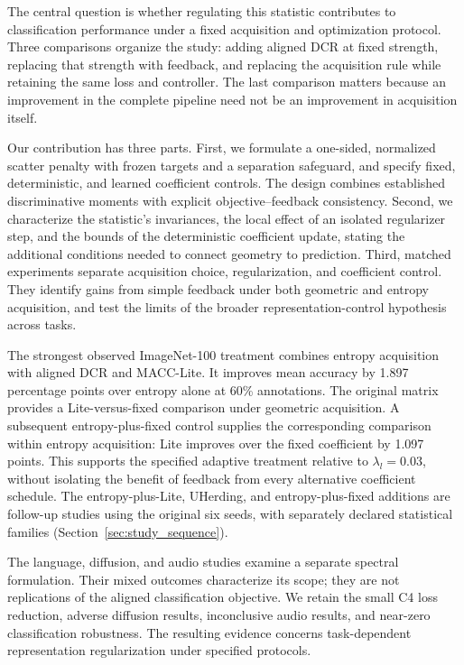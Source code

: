 \documentclass[a4paper,fleqn]{cas-dc}
\begin{document}
The central question is whether regulating this statistic contributes
to classification performance under a fixed acquisition and optimization
protocol. Three comparisons organize the study: adding aligned DCR at
fixed strength, replacing that strength with feedback, and replacing the
acquisition rule while retaining the same loss and controller. The last
comparison matters because an improvement in the complete pipeline need
not be an improvement in acquisition itself.

Our contribution has three parts. First, we formulate a one-sided,
normalized scatter penalty with frozen targets and a separation safeguard,
and specify fixed, deterministic, and learned coefficient controls.
The design combines established discriminative moments with explicit
objective--feedback consistency. Second, we characterize the statistic's
invariances, the local effect of an isolated regularizer step, and the
bounds of the deterministic coefficient update, stating the additional
conditions needed to connect geometry to prediction. Third, matched
experiments separate acquisition choice, regularization, and coefficient
control. They identify gains from simple feedback under both geometric
and entropy acquisition, and test the limits of the broader
representation-control hypothesis across tasks.

The strongest observed ImageNet-100 treatment combines entropy acquisition
with aligned DCR and MACC-Lite. It improves mean accuracy by 1.897
percentage points over entropy alone at 60\% annotations. The original
matrix provides a Lite-versus-fixed comparison under geometric
acquisition. A subsequent entropy-plus-fixed control supplies the
corresponding comparison within entropy acquisition: Lite improves over
the fixed coefficient by 1.097 points. This supports the specified
adaptive treatment relative to $\lambda_l=0.03$, without isolating the
benefit of feedback from every alternative coefficient schedule.
The entropy-plus-Lite, UHerding, and entropy-plus-fixed additions are
follow-up studies using the original six seeds, with separately declared
statistical families (Section~\ref{sec:study_sequence}).

The language, diffusion, and audio studies examine a separate spectral
formulation. Their mixed outcomes characterize its scope; they are not
replications of the aligned classification objective. We retain the
small C4 loss reduction, adverse diffusion results, inconclusive audio
results, and near-zero classification robustness. The resulting evidence
concerns task-dependent representation regularization under specified
protocols.
\end{document}
